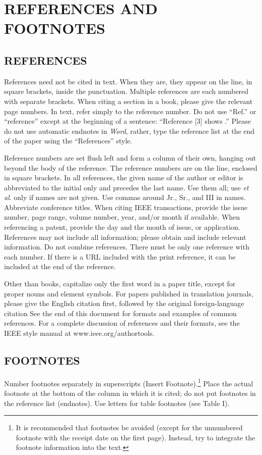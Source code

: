 \section*{REFERENCES AND FOOTNOTES}
\subsection{REFERENCES}
References need not be cited in text. When they are, they appear on the 
line, in square brackets, inside the punctuation. Multiple references are 
each numbered with separate brackets. When citing a section in a book, 
please give the relevant page numbers. In text, refer simply to the 
reference number. Do not use ``Ref.'' or ``reference'' except at the 
beginning of a sentence: ``Reference [3] shows \textellipsis .'' Please do not use 
automatic endnotes in \textit{Word}, rather, type the reference list at the end of the 
paper using the ``References'' style.

Reference numbers are set flush left and form a column of their own, hanging 
out beyond the body of the reference. The reference numbers are on the line, 
enclosed in square brackets. In all references, the given name of the author 
or editor is abbreviated to the initial only and precedes the last name. Use 
them all; use \textit{et al}. only if names are not given. Use commas around Jr., Sr., and 
III in names. Abbreviate conference titles. When citing IEEE transactions, 
provide the issue number, page range, volume number, year, and/or month if 
available. When referencing a patent, provide the day and the month of 
issue, or application. References may not include all information; please 
obtain and include relevant information. Do not combine references. There 
must be only one reference with each number. If there is a URL included with 
the print reference, it can be included at the end of the reference. 

Other than books, capitalize only the first word in a paper title, except 
for proper nouns and element symbols. For papers published in translation 
journals, please give the English citation first, followed by the original 
foreign-language citation See the end of this document for formats and 
examples of common references. For a complete discussion of references and 
their formats, see the IEEE style manual at www.ieee.org/authortools.


\subsection{FOOTNOTES}
Number footnotes separately in superscripts (Insert\textbar 
Footnote).\footnote{It is recommended that footnotes be avoided (except for 
the unnumbered footnote with the receipt date on the first page). Instead, 
try to integrate the footnote information into the text.} Place the actual 
footnote at the bottom of the column in which it is cited; do not put 
footnotes in the reference list (endnotes). Use letters for table footnotes 
(see Table I). 
